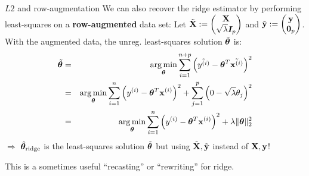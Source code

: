 \documentclass[11pt,compress,t,notes=noshow, xcolor=table]{beamer}
\begin{document}
\begin{vbframe}{$L2$ and row-augmentation}
We can also recover the ridge estimator by performing least-squares on a \textbf{row-augmented} data set: Let $\tilde{\mathbf{X}}:= \begin{pmatrix} \mathbf{X} \\ \sqrt{\lambda} \boldsymbol{I}_{p} \end{pmatrix}$ and $\tilde{\mathbf{y}} := \begin{pmatrix}
    \mathbf{y} \\ \bm{0}_{p}
\end{pmatrix}$. \\
With the augmented data, the unreg. least-squares solution $\tilde{\bm{\theta}}$ is:
{\small
\begin{eqnarray*}
\tilde{\thetab} &=& \argmin_{\thetab} 
\sum_{i=1}^{n+p} \left(\tilde{\yi} - \thetab^T \tilde{\xi} \right)^2 \\ &=& \argmin_{\thetab} 
\sum_{i=1}^{n} \left(\yi - \thetab^T \xi \right)^2 + \sum_{j=1}^{p} \left(0 - \sqrt{\lambda} \theta_j \right)^2 \\ %
&=& \argmin_{\thetab} \sumin \left(\yi - \thetab^T \xi \right)^2 + \lambda \|\thetab\|_2^2
\end{eqnarray*}
}
$\Longrightarrow$ $\hat{\bm{\theta}}_{\text{ridge}}$ is the least-squares solution $\tilde{\bm{\theta}}$ but using $\tilde{\mathbf{X}},\tilde{\mathbf{y}}$ instead of $\mathbf{X}, \mathbf{y}$!\\

\lz

This is a sometimes useful ``recasting'' or ``rewriting'' for ridge.
\end{vbframe}
\end{document}
